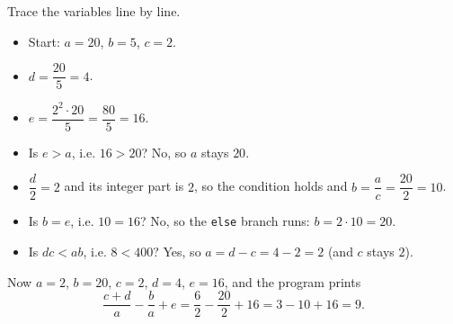 Trace the variables line by line.
\begin{itemize}
\item Start: $a=20$, $b=5$, $c=2$.
\item $d=\dfrac{20}{5}=4$.
\item $e=\dfrac{2^2\cdot20}{5}=\dfrac{80}{5}=16$.
\item Is $e>a$, i.e. $16>20$? No, so $a$ stays $20$.
\item $\dfrac d2=2$ and its integer part is $2$, so the condition holds and $b=\dfrac ac=\dfrac{20}{2}=10$.
\item Is $b=e$, i.e. $10=16$? No, so the \texttt{else} branch runs: $b=2\cdot10=20$.
\item Is $dc<ab$, i.e. $8<400$? Yes, so $a=d-c=4-2=2$ (and $c$ stays $2$).
\end{itemize}
Now $a=2$, $b=20$, $c=2$, $d=4$, $e=16$, and the program prints
\[\dfrac{c+d}{a}-\dfrac ba+e=\dfrac{6}{2}-\dfrac{20}{2}+16=3-10+16=\boxed{9}.\]
